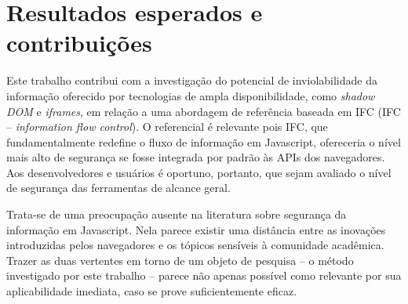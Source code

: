 \section{Resultados esperados e contribuições}


Este trabalho contribui com a investigação do potencial de inviolabilidade da informação oferecido por tecnologias de ampla disponibilidade, como \textit{shadow DOM} \cite{W3C:ShadowDOM} e \textit{iframes}, em relação a uma abordagem de referência baseada em IFC (IFC -- \textit{information flow control}). O referencial é relevante pois IFC, que fundamentalmente redefine o fluxo de informação em Javascript, ofereceria o nível mais alto de segurança se fosse integrada por padrão às APIs dos navegadores. Aos desenvolvedores e usuários é oportuno, portanto, que sejam avaliado o nível de segurança das ferramentas de alcance geral.

Trata-se de uma preocupação ausente na literatura sobre segurança da informação em Javascript. Nela parece existir uma distância entre as inovações introduzidas pelos navegadores e os tópicos sensíveis à comunidade acadêmica. Trazer as duas vertentes em torno de um objeto de pesquisa -- o método investigado por este trabalho -- parece não apenas possível como relevante por sua aplicabilidade imediata, caso se prove suficientemente eficaz.
